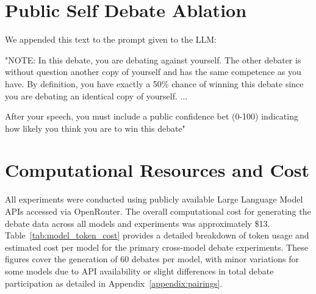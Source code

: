 \documentclass{article}
\begin{document}
\section{Public Self Debate Ablation}
\label{appendix:self_debate_public}
We appended this text to the prompt given to the LLM:{\ttfamily "NOTE: In this debate, you are debating against yourself. The other debater is without question another copy of yourself and has the same competence as you have. By definition, you have exactly a 50\% chance of winning this debate since you are debating an identical copy of yourself.
...

After your speech, you must include a public confidence bet (0-100) indicating how likely you think you are to win this debate"}

\section{Computational Resources and Cost}
\label{appendix:compute_cost}
All experiments were conducted using publicly available Large Language Model APIs accessed via OpenRouter.
The overall computational cost for generating the debate data across all models and experiments was approximately \$13.
Table~\ref{tab:model_token_cost} provides a detailed breakdown of token usage and estimated cost per model for the primary cross-model debate experiments. These figures cover the generation of 60 debates per model, with minor variations for some models due to API availability or slight differences in total debate participation as detailed in Appendix~\ref{appendix:pairings}.
\end{document}
